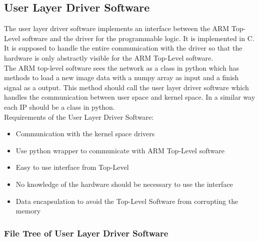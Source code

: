 \subsection{User Layer Driver Software}
The user layer driver software implements an interface between the ARM Top-Level software and the driver for the programmable logic. It is implemented in C. It is supposed to handle the entire communication with the driver so that the hardware is only abstractly visible for the ARM Top-Level software.\\
The ARM top-level software sees the network as a class in python which has methods to load a new image data with a numpy array as input and a finish signal as a output. This method should call the user layer driver software which handles the communication between user space and kernel space. In a similar way each IP should be a class in python. \\
Requirements of the User Layer Driver Software:
\begin{itemize} 
	\item Communication with the kernel space drivers 
	\item Use python wrapper to communicate with ARM Top-Level software
	\item Easy to use interface from Top-Level 
	\item No knowledge of the hardware should be necessary to use the interface
	\item Data encapsulation to avoid the Top-Level Software from corrupting the memory 
\end{itemize}

\subsubsection{File Tree of User Layer Driver Software} 